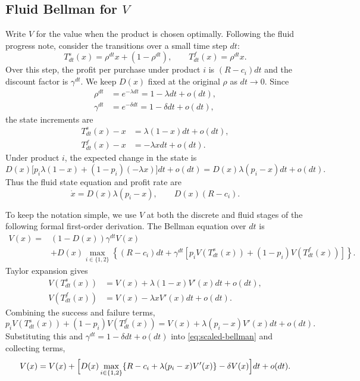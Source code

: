 \documentclass[11pt]{article}
\begin{document}
\subsection*{Fluid Bellman for $V$}
Write $V$ for the value when the product is chosen optimally.
Following the fluid progress note, consider the transitions over a
small time step $dt$:
\begin{equation*}
T^s_{dt}(x)=\rho^{dt}x+(1-\rho^{dt}),\qquad
T^f_{dt}(x)=\rho^{dt}x.
\end{equation*}
Over this step, the profit per purchase under product $i$ is $(R-c_i)dt$
and the discount factor is $\gamma^{dt}$. We keep $D(x)$ fixed at the
original $\rho$ as $dt\to0$.
Since
\begin{align*}
\rho^{dt}&=e^{-\lambda dt}=1-\lambda dt+o(dt),\\
\gamma^{dt}&=e^{-\delta dt}=1-\delta dt+o(dt),
\end{align*}
the state increments are
\begin{align*}
T^s_{dt}(x)-x&=\lambda(1-x)dt+o(dt),\\
T^f_{dt}(x)-x&=-\lambda xdt+o(dt).
\end{align*}
Under product $i$, the expected change in the state is
\begin{equation*}
D(x)\bigl[p_i\lambda(1-x)+(1-p_i)(-\lambda x)\bigr]dt+o(dt)
=D(x)\lambda(p_i-x)dt+o(dt).
\end{equation*}
Thus the fluid state equation and profit rate are
\begin{equation}\label{eq:fluid-dynamics}
\dot x=D(x)\lambda(p_i-x),\qquad D(x)(R-c_i).
\end{equation}

To keep the notation simple, we use $V$ at both the discrete and fluid
stages of the following formal first-order derivation. The Bellman
equation over $dt$ is
\begin{equation}\label{eq:scaled-bellman}
\begin{aligned}
V(x)={}&(1-D(x))\gamma^{dt}V(x)\\
&+D(x)\max_{i\in\{1,2\}}\left\{(R-c_i)dt+\gamma^{dt}
\left[p_iV(T^s_{dt}(x))+(1-p_i)V(T^f_{dt}(x))\right]\right\}.
\end{aligned}
\end{equation}
Taylor expansion gives
\begin{align*}
V(T^s_{dt}(x))&=V(x)+\lambda(1-x)V'(x)dt+o(dt),\\
V(T^f_{dt}(x))&=V(x)-\lambda xV'(x)dt+o(dt).
\end{align*}
Combining the success and failure terms,
\begin{equation*}
p_iV(T^s_{dt}(x))+(1-p_i)V(T^f_{dt}(x))
=V(x)+\lambda(p_i-x)V'(x)dt+o(dt).
\end{equation*}
Substituting this and $\gamma^{dt}=1-\delta dt+o(dt)$ into
\eqref{eq:scaled-bellman} and collecting terms,
\begin{align*}
V(x)=V(x)+\Bigl[
D(x)\max_{i\in\{1,2\}}\{R-c_i+\lambda(p_i-x)V'(x)\}
-\delta V(x)\Bigr]dt+o(dt).
\end{align*}
\end{document}
